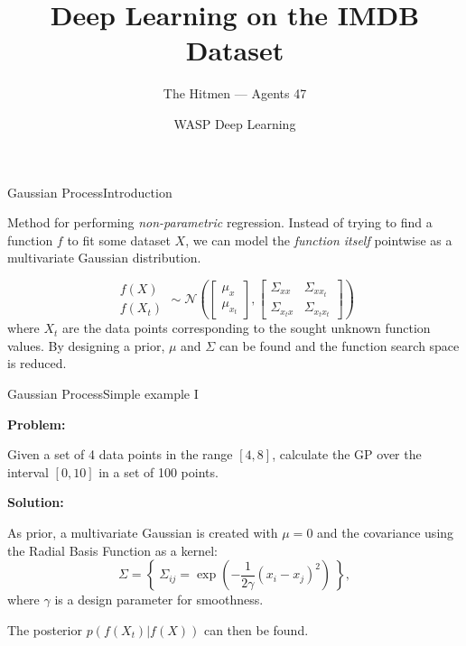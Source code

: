\documentclass{beamer}
\title{Deep Learning on the IMDB Dataset}
\date{WASP Deep Learning}
\author[Agents 47]{The Hitmen --- Agents 47}
\begin{document}
\begin{frame}
  \titlepage
\end{frame}


\begin{frame}{Gaussian Process}{Introduction}

Method for performing \emph{non-parametric} regression. Instead of trying to find a function $f$ to fit some dataset $X$, we can model the \emph{function itself} pointwise as a multivariate Gaussian distribution.

\begin{equation}
\begin{matrix}
	f(X) \\
	f(X_t)
\end{matrix} \sim
\mathcal{N} \left(
	\begin{bmatrix}
		\mu_x \\
		\mu_{x_t}
	\end{bmatrix}, 
	\begin{bmatrix}
		\Sigma_{xx} & \Sigma_{xx_t} \\
		\Sigma_{x_tx} & \Sigma_{x_tx_t}
	\end{bmatrix}
\right)
\end{equation}
where $X_t$ are the data points corresponding to the sought unknown function values. By designing a prior, $\mu$ and $\Sigma$ can be found and the function search space is reduced.  


\end{frame}

\begin{frame}{Gaussian Process}{Simple example I}
	
	\textbf{Problem:}
	
		Given a set of 4 data points in the range $[4, 8]$, calculate the GP over the interval $[0, 10]$ in a set of 100 points. 
		
	\textbf{Solution:}

	As prior, a multivariate Gaussian is created with $\mu = 0$ and the covariance using the Radial Basis Function as a kernel:
	\begin{equation}
		\Sigma = \left\{~\Sigma_{ij} = \exp \left( -\frac{1}{2\gamma} (x_i- x_j)^2 \right) ~ \right\},
	\end{equation}
	where $\gamma$ is a design parameter for smoothness. 
	
	The posterior $p \left( f(X_t) | f(X) \right) $ can then be found. 

\end{frame}
\end{document}
